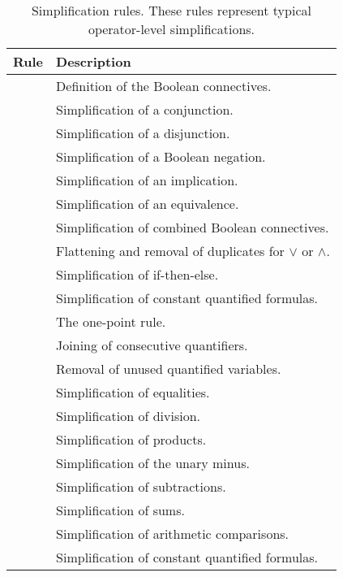\begin{xltabular}{\linewidth}{l X}
\caption{Simplification rules. These rules represent typical operator-level
simplifications.}
\label{rule-tab:simplification}\\
  Rule & Description \\
  \hline
{} & Definition of the Boolean connectives. \\
 & Simplification of a conjunction. \\
 & Simplification of a disjunction. \\
 & Simplification of a Boolean negation. \\
 & Simplification of an implication. \\
 & Simplification of an equivalence. \\
 & Simplification of combined Boolean connectives. \\
 & Flattening and removal of duplicates for $\lor$ or $\land$. \\
 & Simplification of if-then-else. \\
 & Simplification of constant quantified formulas. \\
 & The one-point rule. \\
 & Joining of consecutive quantifiers. \\
 & Removal of unused quantified variables. \\
 & Simplification of equalities. \\
 & Simplification of division. \\
 & Simplification of products. \\
 & Simplification of the unary minus. \\
 & Simplification of subtractions. \\
 & Simplification of sums. \\
 & Simplification of arithmetic comparisons. \\
 & Simplification of constant quantified formulas. \\
\end{xltabular}

